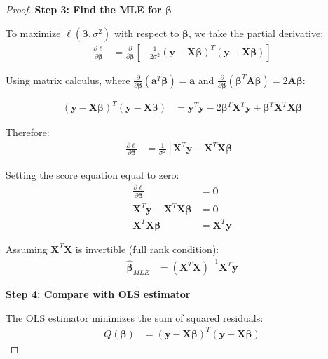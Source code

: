 \documentclass{article}
\begin{document}
\begin{proof}
\textbf{Step 3: Find the MLE for $\boldsymbol{\beta}$}

To maximize $\ell(\boldsymbol{\beta}, \sigma^2)$ with respect to $\boldsymbol{\beta}$, we take the partial derivative:
\begin{align}
\frac{\partial \ell}{\partial \boldsymbol{\beta}} &= \frac{\partial}{\partial \boldsymbol{\beta}}\left[-\frac{1}{2\sigma^2}(\mathbf{y} - \mathbf{X}\boldsymbol{\beta})^T(\mathbf{y} - \mathbf{X}\boldsymbol{\beta})\right]
\end{align}

Using matrix calculus, where $\frac{\partial}{\partial \boldsymbol{\beta}}(\mathbf{a}^T\boldsymbol{\beta}) = \mathbf{a}$ and $\frac{\partial}{\partial \boldsymbol{\beta}}(\boldsymbol{\beta}^T\mathbf{A}\boldsymbol{\beta}) = 2\mathbf{A}\boldsymbol{\beta}$:

\begin{align}
(\mathbf{y} - \mathbf{X}\boldsymbol{\beta})^T(\mathbf{y} - \mathbf{X}\boldsymbol{\beta}) &= \mathbf{y}^T\mathbf{y} - 2\boldsymbol{\beta}^T\mathbf{X}^T\mathbf{y} + \boldsymbol{\beta}^T\mathbf{X}^T\mathbf{X}\boldsymbol{\beta}
\end{align}

Therefore:
\begin{align}
\frac{\partial \ell}{\partial \boldsymbol{\beta}} &= \frac{1}{\sigma^2}\left[\mathbf{X}^T\mathbf{y} - \mathbf{X}^T\mathbf{X}\boldsymbol{\beta}\right] \label{eq:score_beta}
\end{align}

Setting the score equation equal to zero:
\begin{align}
\frac{\partial \ell}{\partial \boldsymbol{\beta}} &= \mathbf{0} \nonumber\\
\mathbf{X}^T\mathbf{y} - \mathbf{X}^T\mathbf{X}\boldsymbol{\beta} &= \mathbf{0} \nonumber\\
\mathbf{X}^T\mathbf{X}\boldsymbol{\beta} &= \mathbf{X}^T\mathbf{y} \label{eq:normal_eq}
\end{align}

Assuming $\mathbf{X}^T\mathbf{X}$ is invertible (full rank condition):
\begin{align}
\hat{\boldsymbol{\beta}}_{MLE} &= (\mathbf{X}^T\mathbf{X})^{-1}\mathbf{X}^T\mathbf{y} \label{eq:mle_beta}
\end{align}

\textbf{Step 4: Compare with OLS estimator}

The OLS estimator minimizes the sum of squared residuals:
\begin{align}
Q(\boldsymbol{\beta}) &= (\mathbf{y} - \mathbf{X}\boldsymbol{\beta})^T(\mathbf{y} - \mathbf{X}\boldsymbol{\beta}) \label{eq:ols_objective}
\end{align}


\end{proof}
\end{document}
